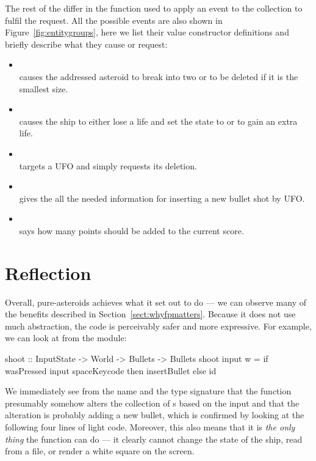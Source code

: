 \documentclass[
  digital, %
  color,   %
  table,   %
  oneside, %
  lof,     %
  lot,     %
]{fithesis3}
\begin{document}
{The rest of the  differ in the function used to apply an event to the collection
to fulfil the request. All the possible events are also shown in
Figure~\ref{fig:entitygroups}, here we list their value constructor definitions
and briefly describe what they cause or request:
\begin{itemize}[--]
    \item {}\\
    causes the addressed asteroid to break into two or to be deleted if it is the smallest size.
    
    \item {}\\
    causes the ship to either lose a life and set the state to 
    or to gain an extra life.
    
    \item {}\\
    targets a UFO and simply requests its deletion.
    
    \item {}\\
    gives the  all the needed information for inserting a new
    bullet shot by UFO.
    
    \item {}\\
    says how many points should be added to the current score.
\end{itemize}



\section{Reflection}
\label{sect:purereflection}

Overall, pure-asteroids achieves what it set out to do --- we can observe
many of the benefits described in Section~\ref{sect:whyfpmatters}.
Because it does not use much abstraction, the code is perceivably safer and more expressive.
For example, we can look at  from the  module:
\begin{haskell}
shoot :: InputState -> World -> Bullets -> Bullets
shoot input w =
    if wasPressed input spaceKeycode
        then insertBullet
        else id
\end{haskell}
We immediately see from the name and the type signature that the function presumably
somehow alters the collection of s based on the input and that
the alteration is probably adding a new bullet, which is confirmed by looking
at the following four lines of light code. Moreover, this also means that it is \emph{the only thing}
the function can do --- it clearly cannot change the state of the ship, read from a file,
or render a white square on the screen.

}
\end{document}
